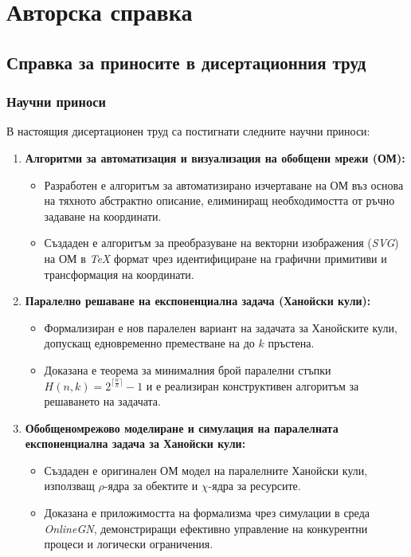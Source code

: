\clearpage
{}
{}
\section*{Авторска справка}

\subsection*{Справка за приносите в дисертационния труд}

\subsubsection*{Научни приноси}

В настоящия дисертационен труд са постигнати следните научни приноси:

\begin{enumerate}[label=\arabic*., leftmargin=*]
	\item \textbf{Алгоритми за автоматизация и визуализация на обобщени мрежи (ОМ):}
	\begin{itemize}
		\item Разработен е алгоритъм за автоматизирано изчертаване на ОМ въз основа на тяхното абстрактно описание, елиминиращ необходимостта от ръчно задаване на координати.
		\item Създаден е алгоритъм за преобразуване на векторни изображения (\textit{SVG}) на ОМ в \textit{TeX} формат чрез идентифициране на графични примитиви и трансформация на координати.
	\end{itemize}
	
	\item \textbf{Паралелно решаване на експоненциална задача (Ханойски кули):}
	\begin{itemize}
		\item Формализиран е нов паралелен вариант на задачата за Ханойските кули, допускащ едновременно преместване на до $k$ пръстена.
		\item Доказана е теорема за минималния брой паралелни стъпки $H(n,k) = 2^{\bigl\lceil \textstyle \frac{n}{k} \bigr\rceil} - 1$ и е реализиран конструктивен алгоритъм за решаването на задачата.
	\end{itemize}
	
	\item \textbf{Обобщеномрежово моделиране и симулация на паралелната експоненциална задача за Ханойски кули:}
	\begin{itemize}
		\item Създаден е оригинален ОМ модел на паралелните Ханойски кули, използващ $\rho$-ядра за обектите и $\chi$-ядра за ресурсите.
		\item Доказана е приложимостта на формализма чрез симулации в среда \textit{OnlineGN}, демонстриращи ефективно управление на конкурентни процеси и логически ограничения.
	\end{itemize}
\end{enumerate}

